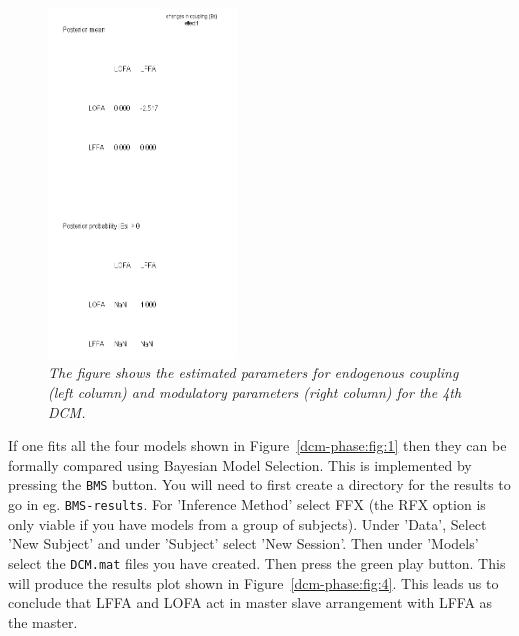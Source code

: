\begin{figure}
\begin{center}
\includegraphics[width=50mm]{multimodal/figures/modulatory}
\caption{\em The figure shows the estimated parameters for endogenous coupling (left column) and modulatory parameters (right column) for the 4th DCM.  \label{dcm-phase:fig:3}}
\end{center}
\end{figure}

If one fits all the four models shown in Figure~\ref{dcm-phase:fig:1} then they can be formally compared using Bayesian Model Selection. This is implemented by pressing the \texttt{BMS} button. You will need to first create a directory for the results to go in eg. \texttt{BMS-results}. For 'Inference Method' select FFX (the RFX option is only viable if you have models from a group of subjects). Under 'Data', Select 'New Subject' and under 'Subject' select 'New Session'. Then under 'Models' select the \texttt{DCM.mat} files you have created.  Then press the green play button. This will produce the results plot shown in Figure~\ref{dcm-phase:fig:4}. This leads us to conclude that 
LFFA and LOFA act in master slave arrangement with LFFA as the master.

